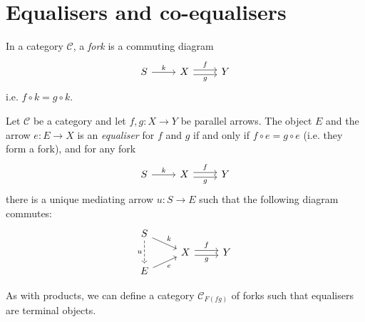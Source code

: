 \documentclass[article, a4paper, 11pt, oneside]{memoir}
\numberwithin{equation}{chapter}
\newcommand{\cat}[1]{\mathcal{#1}}
\newcommand{\catC}{\cat{C}}
\theoremstyle{myexample}
\theoremstyle{myexamplebreak}
\begin{document}
\chapter{Equalisers and co-equalisers}

In a category $\catC$, a \emph{fork} is a commuting diagram
%
\begin{equation*}
    \begin{tikzcd}
        S
            \ar[r, "k"]
        & X
            \ar[r, "f", shift left]
            \ar[r, "g", shift right, swap]
        & Y
    \end{tikzcd}
\end{equation*}
%
i.e. $f \circ k = g \circ k$.


\begin{definition}[Equalisers]
    Let $\catC$ be a category and let $f,g \colon X \to Y$ be parallel arrows. The object $E$ and the arrow $e \colon E \to X$ is an \emph{equaliser} for $f$ and $g$ if and only if $f \circ e = g \circ e$ (i.e. they form a fork), and for any fork
    \begin{equation*}
        \begin{tikzcd}
            S
                \ar[r, "k"]
            & X
                \ar[r, "f", shift left]
                \ar[r, "g", shift right, swap]
            & Y
        \end{tikzcd}
    \end{equation*}
    there is a unique mediating arrow $u \colon S \to E$ such that the following diagram commutes:
    \begin{equation*}
        \begin{tikzcd}[row sep=tiny]
            S
                \ar[dr, "k"]
                \ar[dd, "u", swap, dashed]
            \\
            & X
                \ar[r, "f", shift left]
                \ar[r, "g", shift right, swap]
            & Y
            \\
            E
                \ar[ur, "e", swap]
        \end{tikzcd}
    \end{equation*}
\end{definition}
%
As with products, we can define a category $\catC_{F(fg)}$ of forks such that equalisers are terminal objects. 
\end{document}

